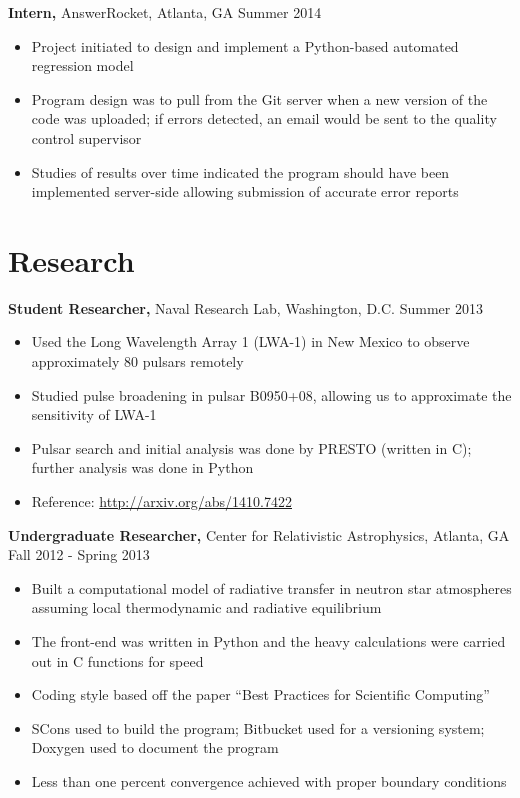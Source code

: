 \documentclass[margin]{res}
\begin{document}
\begin{resume}
 {\bf Intern,} AnswerRocket, Atlanta, GA \hfill Summer 2014
 \begin{itemize} \itemsep -2pt  %
 \item Project initiated to design and implement a Python-based automated regression model
 \item Program design was to pull from the Git server when a new version of the code was uploaded; if errors
       detected, an email would be sent to the quality control supervisor
 \item Studies of results over time indicated the program should have
       been implemented server-side allowing submission of accurate error reports
 \end{itemize}


\section{Research}
 {\bf Student Researcher,} Naval Research Lab, Washington, D.C. \hfill Summer  2013
 \begin{itemize} \itemsep -2pt  %
 \item Used the Long Wavelength Array 1 (LWA-1) in New Mexico to observe 
       approximately 80 pulsars remotely
 \item Studied pulse broadening in pulsar B0950+08, allowing us to approximate 
       the sensitivity of LWA-1
 \item Pulsar search and initial analysis was done by PRESTO (written in C); 
       further analysis was done in Python
 \item Reference: \url{http://arxiv.org/abs/1410.7422}
 \end{itemize}

 {\bf Undergraduate Researcher,} Center for Relativistic Astrophysics, Atlanta, GA \\  Fall 2012 - Spring 2013
 \begin{itemize} \itemsep -2pt %
 \item Built a computational model of radiative transfer in neutron star atmospheres assuming local thermodynamic
       and radiative equilibrium
 \item The front-end was written in Python and the heavy calculations were carried out in C 
       functions for speed
 \item Coding style based off the paper ``Best Practices for Scientific Computing''
 \item SCons used to build the program; Bitbucket used for a versioning system; Doxygen used to document the program
 \item Less than one percent convergence achieved with proper boundary conditions
 \end{itemize}


\end{resume}
\end{document}
